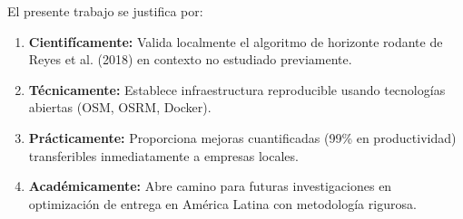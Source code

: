 El presente trabajo se justifica por:

\begin{enumerate}
    \item \textbf{Cientifícamente:} Valida localmente el algoritmo de 
    horizonte rodante de Reyes et al. (2018) en contexto no estudiado previamente.
    
    \item \textbf{Técnicamente:} Establece infraestructura reproducible 
    usando tecnologías abiertas (OSM, OSRM, Docker).
    
    \item \textbf{Prácticamente:} Proporciona mejoras cuantificadas (99\% 
    en productividad) transferibles inmediatamente a empresas locales.
    
    \item \textbf{Académicamente:} Abre camino para futuras investigaciones 
    en optimización de entrega en América Latina con metodología rigurosa.
\end{enumerate}
